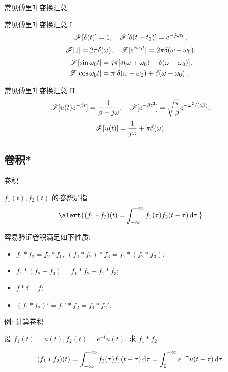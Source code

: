 \begin{frame}{常见傅里叶变换汇总}
	\onslide<+->
	\begin{alertblock}{常见傅里叶变换汇总 I}
		\[\mathscr{F}[\delta(t)]=1,\quad \mathscr{F}[\delta(t-t_0)]=e^{-j\omega t_0},\]
		\[\mathscr{F}[1]=2\pi\delta(\omega),\quad \mathscr{F}[e^{j\omega_0 t}]=2\pi\delta(\omega-\omega_0).\]
		\begin{align*}
		\mathscr{F}[\sin \omega_0t]&=j\pi[\delta(\omega+\omega_0)-\delta(\omega-\omega_0)],\\
		\mathscr{F}[\cos{\omega_0 t}]&=\pi[\delta(\omega+\omega_0)+\delta(\omega-\omega_0)].
		\end{align*}
	\end{alertblock}

	\onslide<+->
	\begin{block}{常见傅里叶变换汇总 II}
		\[\mathscr{F}[u(t)e^{-\beta t}]=\dfrac1{\beta+j\omega},\quad
		\mathscr{F}[e^{-\beta t^2}]=\sqrt{\dfrac\pi\beta}e^{-\omega^2/(4\beta)},\]
		\[\mathscr{F}[u(t)]=\dfrac1{j\omega}+\pi\delta(\omega).\]
	\end{block}
\end{frame}


\subsection{卷积*}
\begin{frame}{卷积\noexer}
	\onslide<+->
	\begin{definition}
		$f_1(t),f_2(t)$ 的\emph{卷积}是指
		\[\alert{(f_1\ast f_2)(t)=\int_{-\infty}^{+\infty} f_1(\tau)f_2(t-\tau)\diff \tau.}\]
	\end{definition}

	\onslide<+->
	容易验证卷积满足如下性质:
	\begin{itemize}
		\item $f_1\ast f_2=f_2\ast f_1,\ (f_1\ast f_2)\ast f_3=f_1\ast(f_2\ast f_3)$;
		\item $f_1\ast(f_2+f_3)=f_1\ast f_2+f_1\ast f_3$;
		\item $f\ast\delta=f$;
		\item $(f_1\ast f_2)'=f_1'\ast f_2=f_1\ast f_2'$.
	\end{itemize}
\end{frame}


\begin{frame}{例: 计算卷积\noexer}
	\onslide<+->
	\begin{example}
		设 $f_1(t)=u(t),f_2(t)=e^{-t}u(t)$. 求 $f_1\ast f_2$.
	\end{example}

	\onslide<+->
	\begin{solution}
			\[(f_1\ast f_2)(t)=\int_{-\infty}^{+\infty} f_2(\tau)f_1(t-\tau)\,\mathrm{d} \tau=\int_0^{+\infty} e^{-\tau}u(t-\tau)\,\mathrm{d} \tau.\]
		\onslide<+->{故 $(f_1\ast f_2)(t)=(1-e^{-t})u(t)$.
		}
	\end{solution}
\end{frame}


